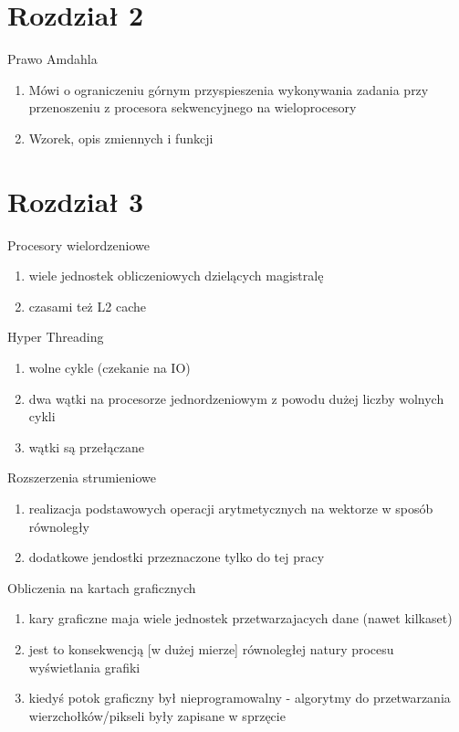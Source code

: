 \documentclass{beamer}
\begin{document}
\section{Rozdział 2}

\begin{frame}{Prawo Amdahla}
  \begin{enumerate}
  \item Mówi o ograniczeniu górnym przyspieszenia wykonywania zadania przy przenoszeniu z procesora sekwencyjnego na wieloprocesory
  \item Wzorek, opis zmiennych i funkcji
  \end{enumerate}
\end{frame}
\section{Rozdział 3}


\begin{frame}{Procesory wielordzeniowe}
  \begin{enumerate}
  \item wiele jednostek obliczeniowych dzielących magistralę
  \item czasami też L2 cache
  \end{enumerate}
\end{frame}

\begin{frame}{Hyper Threading}
  \begin{enumerate}
  \item wolne cykle (czekanie na IO)
  \item dwa wątki na procesorze jednordzeniowym z powodu dużej liczby wolnych cykli
  \item wątki są przełączane
  \end{enumerate}
\end{frame}

\begin{frame}{Rozszerzenia strumieniowe}
  \begin{enumerate}
  \item realizacja podstawowych operacji arytmetycznych na wektorze w sposób równoległy
  \item dodatkowe jendostki przeznaczone tylko do tej pracy
  \end{enumerate}
\end{frame}

\begin{frame}{Obliczenia na kartach graficznych}
  \begin{enumerate}
  \item kary graficzne maja wiele jednostek przetwarzajacych dane (nawet kilkaset)
  \item jest to konsekwencją [w dużej mierze] równoległej natury procesu wyświetlania grafiki
  \item kiedyś potok graficzny był nieprogramowalny - algorytmy do przetwarzania wierzchołków/pikseli były zapisane w sprzęcie
  \end{enumerate}
\end{frame}
\end{document}
